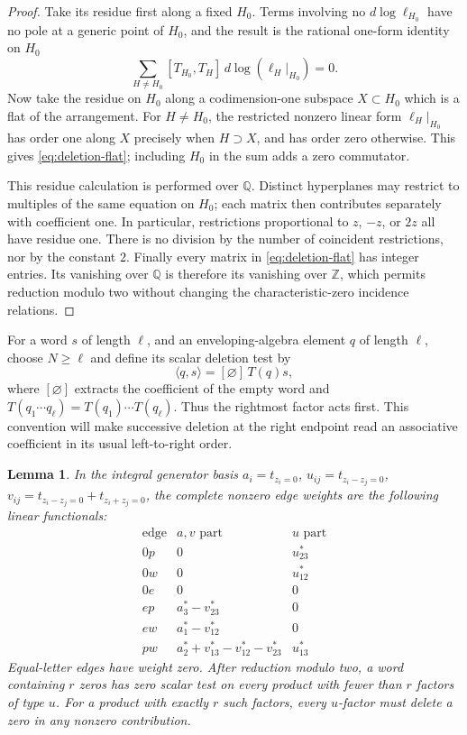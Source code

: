 \documentclass[11pt]{article}
\newcommand{\Q}{\mathbb Q}
\newcommand{\Z}{\mathbb Z}
\newtheorem{lemma}[theorem]{Lemma}
\theoremstyle{definition}
\theoremstyle{remark}
\numberwithin{equation}{section}
\begin{document}
\begin{proof}
Take its residue first along a fixed $H_0$.  Terms involving no
$d\log\ell_{H_0}$ have no pole at a generic point of $H_0$, and the
result is the rational one-form identity on $H_0$
\[
 \sum_{H\ne H_0}[T_{H_0},T_H]\,
 d\log(\ell_H|_{H_0})=0.
\]
Now take the residue on $H_0$ along a codimension-one subspace
$X\subset H_0$ which is a flat of the arrangement.  For $H\ne H_0$,
the restricted nonzero linear form $\ell_H|_{H_0}$ has order one along
$X$ precisely when $H\supset X$, and has order zero otherwise.  This
gives \eqref{eq:deletion-flat}; including $H_0$ in the sum adds a zero
commutator.

This residue calculation is performed over $\Q$.  Distinct hyperplanes
may restrict to multiples of the same equation on $H_0$; each matrix
then contributes separately with coefficient one.  In particular,
restrictions proportional to $z$, $-z$, or $2z$ all have residue one.
There is no division by the number of coincident restrictions, nor by
the constant $2$.  Finally every matrix in \eqref{eq:deletion-flat} has
integer entries.  Its vanishing over $\Q$ is therefore its vanishing
over $\Z$, which permits reduction modulo two without changing the
characteristic-zero incidence relations.
\end{proof}

For a word $s$ of length $\ell$, and an enveloping-algebra element $q$
of length $\ell$, choose $N\geq\ell$ and define its scalar deletion test by
\[
 \langle q,s\rangle=[\varnothing]\,T(q)s,
\]
where $[\varnothing]$ extracts the coefficient of the empty word and
$T(q_1\cdots q_\ell)=T(q_1)\cdots T(q_\ell)$.  Thus the rightmost
factor acts first.  This convention will make successive deletion at
the right endpoint read an associative coefficient in its usual
left-to-right order.

\begin{lemma}\label{lem:edge-table}
In the integral generator basis
$a_i=t_{z_i=0}$, $u_{ij}=t_{z_i-z_j=0}$,
$v_{ij}=t_{z_i-z_j=0}+t_{z_i+z_j=0}$, the complete nonzero edge weights
are the following linear functionals:
\begin{equation}\label{eq:deletion-edge-table}
\begin{array}{c|c|c}
\text{edge}&\text{$a,v$ part}&\text{$u$ part}\\ \hline
0p&0&u_{23}^{*}\\
0w&0&u_{12}^{*}\\
0e&0&0\\
ep&a_3^{*}-v_{23}^{*}&0\\
ew&a_1^{*}-v_{12}^{*}&0\\
pw&a_2^{*}+v_{13}^{*}-v_{12}^{*}-v_{23}^{*}&u_{13}^{*}
\end{array}
\end{equation}
Equal-letter edges have weight zero.  After reduction modulo two, a
word containing $r$ zeros has zero scalar test on every product with
fewer than $r$ factors of type $u$.  For a product with exactly $r$ such
factors, every $u$-factor must delete a zero in any nonzero contribution.
\end{lemma}
\end{document}
